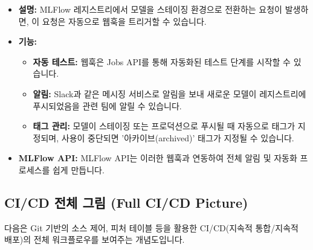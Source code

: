 \documentclass[11pt,a4paper]{article}
\begin{document}
\begin{itemize}
    \item \textbf{설명:} MLFlow 레지스트리에서 모델을 스테이징 환경으로 전환하는 요청이 발생하면, 이 요청은 자동으로 웹훅을 트리거할 수 있습니다.
    \item \textbf{기능:}
    \begin{itemize}
        \item \textbf{자동 테스트:} 웹훅은 Jobs API를 통해 자동화된 테스트 단계를 시작할 수 있습니다.
        \item \textbf{알림:} Slack과 같은 메시징 서비스로 알림을 보내 새로운 모델이 레지스트리에 푸시되었음을 관련 팀에 알릴 수 있습니다.
        \item \textbf{태그 관리:} 모델이 스테이징 또는 프로덕션으로 푸시될 때 자동으로 태그가 지정되며, 사용이 중단되면 '아카이브(archived)' 태그가 지정될 수 있습니다.
    \end{itemize}
    \item \textbf{MLFlow API:} MLFlow API는 이러한 웹훅과 연동하여 전체 알림 및 자동화 프로세스를 쉽게 만듭니다.
\end{itemize}

\subsection{CI/CD 전체 그림 (Full CI/CD Picture)}

다음은 Git 기반의 소스 제어, 피처 테이블 등을 활용한 CI/CD(지속적 통합/지속적 배포)의 전체 워크플로우를 보여주는 개념도입니다.
\end{document}
